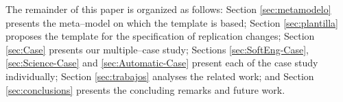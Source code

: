  The remainder of this paper is organized as follows:  Section  \ref{sec:metamodelo} presents the meta--model on which the template is based;  Section \ref{sec:plantilla} proposes the template for the specification of replication changes; Section \ref{sec:Case} presents our multiple--case study; Sections \ref{sec:SoftEng-Case}, \ref{sec:Science-Case} and \ref{sec:Automatic-Case}  present each of the case study individually; Section \ref{sec:trabajos} analyses the related work; and Section \ref{sec:conclusions} presents the concluding remarks and future work.
